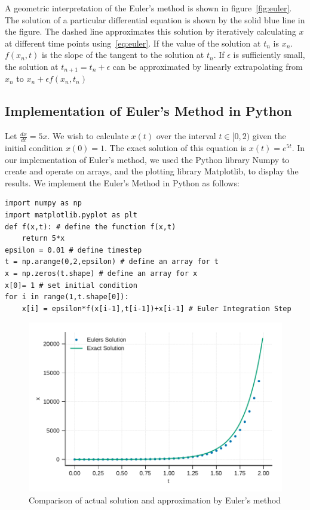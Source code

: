 \documentclass[10pt,letterpaper]{article}
\begin{document}
A geometric interpretation of the Euler's method is shown in figure~\ref{fig:euler}. The solution of a particular differential equation is shown by the solid blue line in the figure. The dashed line approximates this solution by iteratively calculating $x$ at different time points using~\ref{eq:euler}. If the value of the solution at $t_{n}$ is $x_{n}$. $f(x_{n},t)$ is the slope of the tangent to the solution at $t_{n}$. If $\epsilon$ is sufficiently small, the solution at $t_{n+1}=t_{n}+\epsilon$ can be approximated by linearly extrapolating from $x_{n}$ to $x_{n} + \epsilon f(x_{n},t_{n})$

\subsection*{Implementation of Euler's Method in Python}

Let $\frac{dx}{dt}=5x$. We wish to calculate $x(t)$ over the interval $t\in[0,2)$  given the initial condition $x(0)=1$. The exact solution of this equation is $x(t) = e^{5t}$. In our implementation of Euler's method, we used the Python library Numpy to create and operate on arrays, and the plotting library Matplotlib, to display the results. We implement the Euler's Method in Python as follows:

\begin{verbatim}
import numpy as np
import matplotlib.pyplot as plt
def f(x,t): # define the function f(x,t)
    return 5*x
epsilon = 0.01 # define timestep
t = np.arange(0,2,epsilon) # define an array for t
x = np.zeros(t.shape) # define an array for x
x[0]= 1 # set initial condition
for i in range(1,t.shape[0]):
    x[i] = epsilon*f(x[i-1],t[i-1])+x[i-1] # Euler Integration Step
\end{verbatim}

\begin{figure}
\includegraphics[scale=0.7]{Figures/fig2.pdf} 
\caption{Comparison of actual solution and approximation by Euler's method}
\label{fig:eulerError}
\end{figure}
\end{document}
